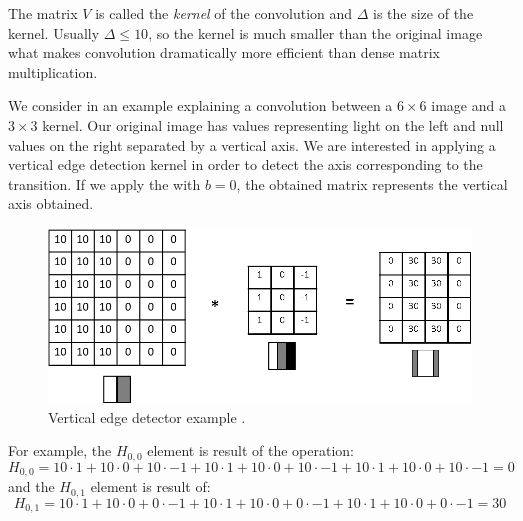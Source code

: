 The matrix \( V \) is called the \textit{kernel} of the convolution and \( \Delta \) is the size of the kernel. Usually \( \Delta \leq 10 \), so the kernel is much smaller than the original image what makes convolution dramatically more efficient than dense matrix multiplication. 

We consider in  an example explaining a convolution between a $6\times6$ image and a $3\times3$ kernel. Our original image has values representing light on the left and null values on the right separated by a vertical axis. We are interested in applying a vertical edge detection kernel in order to detect the axis corresponding to the transition. If we apply the  with $b=0$, the obtained matrix represents the vertical axis obtained.
\begin{figure}[tb]
    \centering
    \includegraphics[scale = 0.80]{figures/chapter2/verticalAxis.png}
    \caption{Vertical edge detector example \cite{verticalEdge}.}
    \label{fig:verticalEdge}
\end{figure}

For example, the $H_{0,0}$ element is result of the operation:
\[H_{0,0}=10\cdot 1 + 10\cdot 0 +10\cdot -1+10\cdot 1 + 10\cdot 0 +10\cdot -1+10\cdot 1 + 10\cdot 0 +10\cdot -1=0\]
and the $H_{0,1}$ element is result of:
\[H_{0,1}=10\cdot 1 + 10\cdot 0 +0\cdot -1+10\cdot 1 + 10\cdot 0 +0\cdot -1+10\cdot 1 + 10\cdot 0 +0\cdot -1=30\]

